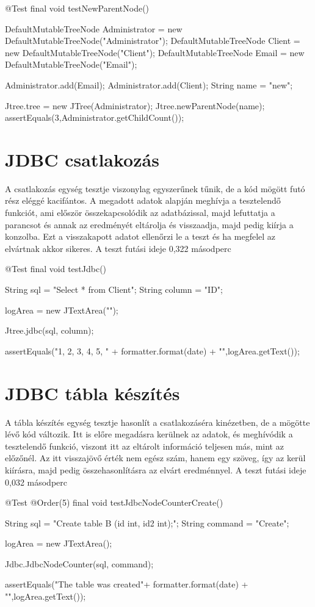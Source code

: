 \begin{java}
@Test
final void testNewParentNode() {
	DefaultMutableTreeNode Administrator =
	 new DefaultMutableTreeNode("Administrator");
	DefaultMutableTreeNode Client =
	 new DefaultMutableTreeNode("Client");
	DefaultMutableTreeNode Email =
	 new DefaultMutableTreeNode("Email");
	
	Administrator.add(Email);
	Administrator.add(Client);
	String name = "new";
	
	Jtree.tree = new JTree(Administrator);
	Jtree.newParentNode(name);
	assertEquals(3,Administrator.getChildCount());
}	
\end{java}

\section{JDBC csatlakozás} A csatlakozás egység tesztje viszonylag egyszerűnek tűnik, de a kód mögött futó rész eléggé kacifántos. A megadott adatok alapján meghívja a tesztelendő funkciót, ami először összekapcsolódik az adatbázissal, majd lefuttatja a parancsot és annak az eredményét eltárolja és visszaadja, majd pedig kiírja a konzolba. Ezt a visszakapott adatot ellenőrzi le a teszt és ha megfelel az elvártnak akkor sikeres. A teszt futási ideje 0,322 másodperc

\begin{java}
@Test
final void testJdbc() {
	
	String sql = "Select * from Client";
	String column = "ID";
	
	logArea = new JTextArea("");
	
	Jtree.jdbc(sql, column);
	
	assertEquals("1,  2,  3,  4,  5,  "
	 + formatter.format(date) + "\n",logArea.getText());
	
}	
\end{java}

\section{JDBC tábla készítés} A tábla készítés egység tesztje hasonlít a csatlakozáséra kinézetben, de a mögötte lévő kód változik. Itt is előre megadásra kerülnek az adatok, és meghívódik a tesztelendő funkció, viszont itt az eltárolt információ teljesen más, mint az előzőnél. Az itt visszajövő érték nem egész szám, hanem egy szöveg, így az kerül kiírásra, majd pedig összehasonlításra az elvárt eredménnyel. A teszt futási ideje 0,032 másodperc

\begin{java}
@Test
@Order(5)
final void testJdbcNodeCounterCreate() {
	String sql = "Create table B (id int, id2 int);";
	String command = "Create";
	
	logArea = new JTextArea();
	
	
	Jdbc.JdbcNodeCounter(sql, command);
	
	assertEquals("The table was created"+
	 formatter.format(date) + "\n",logArea.getText());
	
}	
\end{java}
